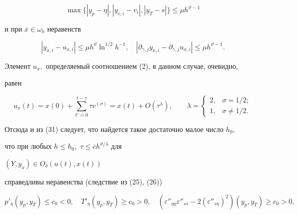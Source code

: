 \begin{equation} 


\max\{|y_p-\eta|,|y_{v,i}-v_i|,|y_T-s|\} \le \mu h^{\vartheta-1} 


\end{equation} 


и при $\overline x \in \omega_h$ неравенств 


\begin{equation} 


|y_{x,i}-u_{x,i}|\le \mu h^\vartheta \ln^{1/2}h^{-1},\quad 


 |\partial_{\gamma,j}y_{x,i}-\partial_{\gamma,j}u_{x,i}| 


 \le \mu h^{\vartheta-1}. 


\end{equation} 





Элемент $u_x,$ определяемый соотношением (2), в данном случае, очевидно, 


равен 


$$ 


u_x(t)=x(0)+\sum^{t-\tau}_{t'=0}\tau v^{(\sigma)}=x(t) 


 +O(\tau^\lambda),\qquad 


\lambda= 


\begin{cases} 


2,& \sigma=1/2;\\ 


1,& \sigma\ne 1/2. 


\end{cases} 


$$ 


Отсюда и из (31) следует, что найдется такое достаточно малое число $h_0,$ 


что при любых $h\le h_0,$ $\tau\le\overline ch^{\vartheta/\lambda}$ для 


$(Y,y_x)\in O_\delta(u(t),x(t))$ 


справедливы неравенства (следствие из (25), (26)) 


\begin{equation} 


p'_\eta(y_p,y_T)\le c_0<0,\quad T'_\eta(y_p,y_T)\ge c_0>0, \quad 


(\varepsilon''_{\eta\eta}\varepsilon''_{ss}-2(\varepsilon''_{s\eta})^2)(y_p,y_T)\ge c_0>0, 


\end{equation} 



